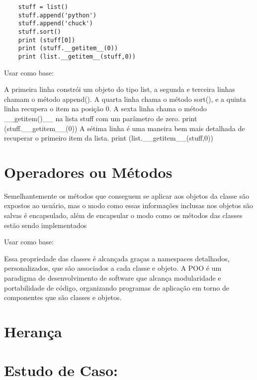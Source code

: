    \begin{lstlisting}
    stuff = list()
    stuff.append('python')
    stuff.append('chuck')
    stuff.sort()
    print (stuff[0])
    print (stuff.__getitem__(0))
    print (list.__getitem__(stuff,0))
    \end{lstlisting}
	
	Usar como base:
	
	A primeira linha constrói um objeto do tipo list, a segunda e terceira linhas chamam o método append(). A quarta linha chama o método sort(), e a quinta linha recupera o item na posição 0. A sexta linha chama o método __getitem()__ na lista stuff com um parâmetro de zero. print (stuff.__getitem__(0))
	A sétima linha é uma maneira bem mais detalhada de recuperar o primeiro item da lista. print (list.__getitem__(stuff,0))
    \section{Operadores ou Métodos}
	Semelhantemente os métodos que conseguem se aplicar aos objetos da classe são expostos ao usuário, mas o modo como essas informações inclusas nos objetos são salvas é encapsulado, além de encapsular o modo como os métodos das classes estão sendo implementados
	
	Usar como base:
	
	Essa propriedade das classes é alcançada graças a namespaces detalhados, personalizados, que são associados a cada classe e objeto. A POO é um paradigma de desenvolvimento de software que alcança modularidade e portabilidade de código, organizando programas de aplicação em torno de componentes que são classes e objetos.
    \section{Herança}


    \section{Estudo de Caso: }
